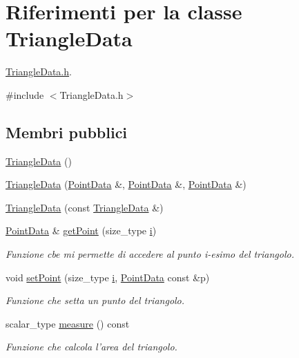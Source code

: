 \hypertarget{classTriangleData}{\section{Riferimenti per la classe Triangle\-Data}
\label{classTriangleData}
}


\hyperlink{TriangleData_8h}{Triangle\-Data.\-h}.  




{\ttfamily \#include $<$Triangle\-Data.\-h$>$}

\subsection*{Membri pubblici}
\begin{DoxyCompactItemize}
\item 
\hyperlink{classTriangleData_a51eec85cf2641bcdb7fbe596debf75e7}{Triangle\-Data} ()
\item 
\hyperlink{classTriangleData_a1a730b42b2fa2052689cad3cae0ee9f4}{Triangle\-Data} (\hyperlink{classPointData}{Point\-Data} \&, \hyperlink{classPointData}{Point\-Data} \&, \hyperlink{classPointData}{Point\-Data} \&)
\item 
\hyperlink{classTriangleData_ae628dd736844f1544b5e245588319d92}{Triangle\-Data} (const \hyperlink{classTriangleData}{Triangle\-Data} \&)
\item 
\hyperlink{classPointData}{Point\-Data} \& \hyperlink{classTriangleData_a88917dafcb5155d2359e5aeb4f8f36e2}{get\-Point} (size\-\_\-type \hyperlink{matrici_8m_a6f6ccfcf58b31cb6412107d9d5281426}{i})
\begin{DoxyCompactList}\small\item\em Funzione cbe mi permette di accedere al punto i-\/esimo del triangolo. \end{DoxyCompactList}\item 
void \hyperlink{classTriangleData_a24c79732610361d5e11ee7ac2d577467}{set\-Point} (size\-\_\-type \hyperlink{matrici_8m_a6f6ccfcf58b31cb6412107d9d5281426}{i}, \hyperlink{classPointData}{Point\-Data} const \&p)
\begin{DoxyCompactList}\small\item\em Funzione che setta un punto del triangolo. \end{DoxyCompactList}\item 
scalar\-\_\-type \hyperlink{classTriangleData_acbfbc62d5221ecd37437012fe8b68c8d}{measure} () const 
\begin{DoxyCompactList}\small\item\em Funzione che calcola l'area del triangolo. \end{DoxyCompactList}\item 

\end{DoxyCompactItemize}
